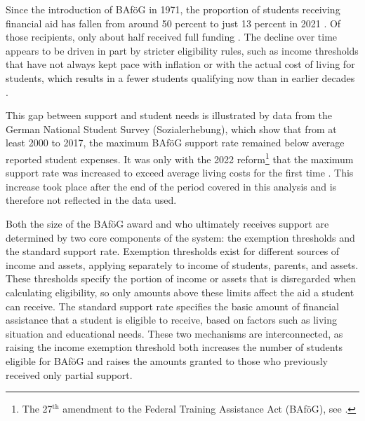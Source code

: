 Since the introduction of BAföG in 1971, the proportion of students receiving financial aid has fallen from around 50 percent to just 13 percent in 2021 \citep{kroher_studierendenbefragung_2023}. 
Of those recipients, only about half received full funding \citep{meier_zur_2024}. 
The decline over time appears to be driven in part by stricter eligibility rules, such as income thresholds that have not always kept pace with inflation or with the actual cost of living for students, which results in a fewer students qualifying now than in earlier decades \citep{meier_zur_2024}.

This gap between support and student needs is illustrated by data from the German National Student Survey (Sozialerhebung), which show that from at least 2000 to 2017, the maximum BAföG support rate remained below average reported student expenses. 
It was only with the 2022 reform\footnote{The 27\(^{\text{th}}\) amendment to the Federal Training Assistance Act (BAföG), see \cite{bafoeg_law}.} that the maximum support rate was increased to exceed average living costs for the first time \citep{meier_bafog_2024, meier_zur_2024}. This increase took place after the end of the period covered in this analysis and is therefore not reflected in the data used.

Both the size of the BAföG award and who ultimately receives support are determined by two core components of the system: the exemption thresholds and the standard support rate. 
Exemption thresholds exist for different sources of income and assets, applying separately to income of students, parents, and assets. 
These thresholds specify the portion of income or assets that is disregarded when calculating eligibility, so only amounts above these limits affect the aid a student can receive. 
The standard support rate specifies the basic amount of financial assistance that a student is eligible to receive, based on factors such as living situation and educational needs.
These two mechanisms are interconnected, as raising the income exemption threshold both increases the number of students eligible for BAföG and raises the amounts granted to those who previously received only partial support. 

